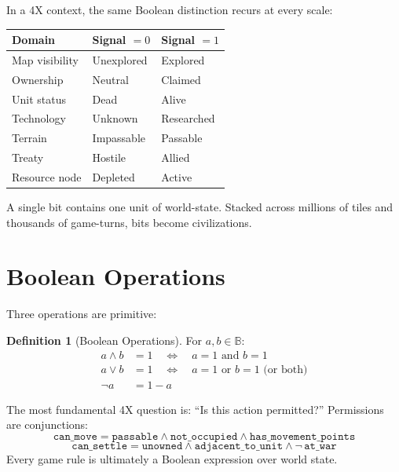 \documentclass[11pt,a4paper,openany]{book}
\theoremstyle{plain}
\theoremstyle{definition}
\newtheorem{definition}[theorem]{Definition}
\theoremstyle{remark}
\newenvironment{mechanic}[1]{%
  \begin{tcolorbox}[
    title={\textbf{World Mechanic:} #1},
    colback=sphereteal!5,
    colframe=sphereteal,
    fonttitle=\bfseries\color{white},
    coltitle=white,
    sharp corners,
    breakable,
    before upper={\normalfont\setlength{\parindent}{0pt}\tolerance=9999\hbadness=9999}
  ]
}{\end{tcolorbox}}
\newcommand{\bool}{\mathbb{B}}
\newcommand{\AND}{\ensuremath{\wedge}}
\newcommand{\OR}{\ensuremath{\vee}}
\newcommand{\NOT}{\ensuremath{\neg}}
\begin{document}
In a 4X context, the same Boolean distinction recurs at every scale:

\begin{center}
\begin{tabular}{lll}
  \toprule
  \textbf{Domain} & \textbf{Signal $= 0$} & \textbf{Signal $= 1$} \\
  \midrule
  Map visibility  & Unexplored           & Explored              \\
  Ownership       & Neutral              & Claimed               \\
  Unit status     & Dead                 & Alive                 \\
  Technology      & Unknown              & Researched            \\
  Terrain         & Impassable           & Passable              \\
  Treaty          & Hostile              & Allied                \\
  Resource node   & Depleted             & Active                \\
  \bottomrule
\end{tabular}
\end{center}

A single bit contains one unit of world-state. Stacked across millions of
tiles and thousands of game-turns, bits become civilizations.

\section{Boolean Operations}

Three operations are primitive:

\begin{definition}[Boolean Operations]
  For $a, b \in \bool$:
  \begin{align}
    a \AND b &= 1 \quad \Leftrightarrow \quad a = 1 \text{ and } b = 1 \\
    a \OR b  &= 1 \quad \Leftrightarrow \quad a = 1 \text{ or } b = 1
                        \text{ (or both)} \\
    \NOT a   &= 1 - a
  \end{align}
\end{definition}

\begin{mechanic}{Permission Logic}
  The most fundamental 4X question is: ``Is this action permitted?''
  Permissions are conjunctions:
  \[
    \texttt{can\_move} = \texttt{passable} \AND \texttt{not\_occupied}
    \AND \texttt{has\_movement\_points}
  \]
  \[
    \texttt{can\_settle} = \texttt{unowned} \AND \texttt{adjacent\_to\_unit}
    \AND \NOT\, \texttt{at\_war}
  \]
  Every game rule is ultimately a Boolean expression over world state.
\end{mechanic}
\end{document}
